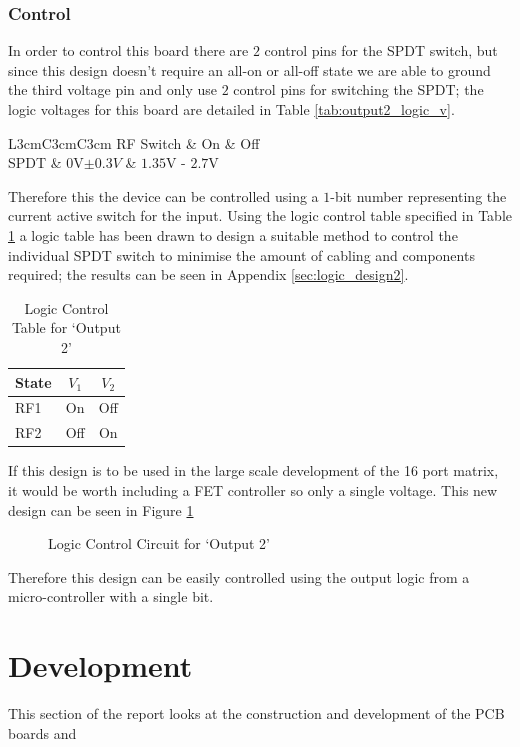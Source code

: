 \documentclass[12pt,openany,a4paper]{book}
\begin{document}
\subsubsection{Control}
In order to control this board there are $2$ control pins for the SPDT switch, but since this design doesn't require an all-on or all-off state we are able to ground the third voltage pin and only use $2$ control pins for switching the SPDT; the logic voltages for this board are detailed in Table \ref{tab:output2_logic_v}.
\begin{table}[H]
	\centering
	\begin{tabular}{L{3cm}C{3cm}C{3cm}}
	\hline
	RF Switch & On & Off\\
	\hline
	SPDT & $0$V$\pm 0.3V$ & $1.35$V - $2.7$V \\
	\hline	
	\end{tabular}
	\caption{Logic Voltage Control}
	\label{tab:output2_logic_v}
\end{table}
Therefore this the device can be controlled using a $1$-bit number representing the current active switch for the input. Using the logic control table specified in Table \ref{tab:logic-cont-output2} a logic table has been drawn to design a suitable method to control the individual SPDT switch to minimise the amount of cabling and components required; the results can be seen in Appendix \ref{sec:logic_design2}. 
\begin{table}[H]
	\centering
	\begin{tabular}{l c c }
		\hline
		State & $V_1$ & $V_2$\\
		\hline
		RF1 & On & Off \\
		RF2 & Off & On \\
		\hline
	\end{tabular}
    \caption{Logic Control Table for `Output 2'} \label{tab:logic-cont-output2}
\end{table}
If this design is to be used in the large scale development of the 16 port matrix, it would be worth including a FET controller so only a single voltage. This new design can be seen in Figure \ref{fig:output2-control}
\begin{figure}[H]
	\centering
	\caption{Logic Control Circuit for `Output 2'}
	\label{fig:output2-control}
\end{figure} 
Therefore this design can be easily controlled using the output logic from a micro-controller with a single bit.


\section{Development}
This section of the report looks at the construction and development of the PCB boards and 
\end{document}

